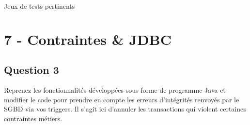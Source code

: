 \documentclass{article}
\begin{document}
Jeux de tests pertinents

\section*{7 - Contraintes \& JDBC}
\subsection*{Question 3}

Reprenez les fonctionnalités développées sous forme de programme Java et modifier le code pour prendre
en compte les erreurs d’intégrités renvoyés par le SGBD via vos triggers. Il s’agit ici d’annuler
les transactions qui violent certaines contraintes métiers.
\end{document}
